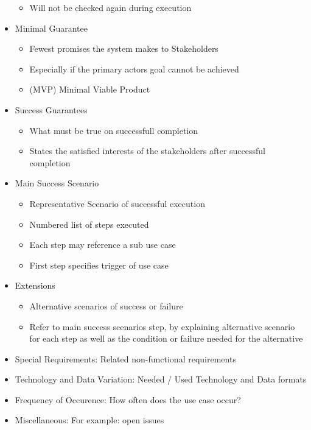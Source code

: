 \documentclass[
../../Software_Engineering_Summary.tex,
]
{subfiles}
\begin{document}
\begin{defbox}
\begin{itemize}
\begin{itemize}
            \item Will not be checked again during execution
        \end{itemize}
        \item Minimal Guarantee
        \begin{itemize}
            \item Fewest promises the system makes to Stakeholders
            \item Especially if the primary actors goal cannot be achieved
            \item (MVP) Minimal Viable Product
        \end{itemize}
        \item Success Guarantees
        \begin{itemize}
            \item What must be true on successfull completion
            \item States the satisfied interests of the stakeholders after successful completion
        \end{itemize}
        \item Main Success Scenario
        \begin{itemize}
            \item Representative Scenario of successful execution
            \item Numbered list of steps executed
            \item Each step may reference a sub use case
            \item First step specifies trigger of use case
        \end{itemize}
        \item Extensions
        \begin{itemize}
            \item Alternative scenarios of success or failure
            \item Refer to main success scenarios step, by explaining alternative scenario for each step as well as the condition or failure needed for the alternative
        \end{itemize}
        \item Special Requirements: Related non-functional requirements
        \item Technology and Data Variation: Needed / Used Technology and Data formats
        \item Frequency of Occurence: How often does the use case occur?
        \item Miscellaneous: For example: open issues
    \end{itemize}
\end{defbox}
\end{document}
